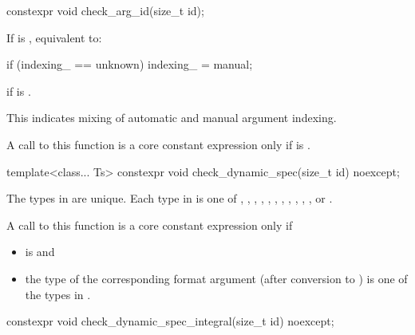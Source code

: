 %
\begin{itemdecl}
constexpr void check_arg_id(size_t id);
\end{itemdecl}

\begin{itemdescr}
\pnum
\effects
If  is , equivalent to:
\begin{codeblock}
if (indexing_ == unknown)
  indexing_ = manual;
\end{codeblock}

\pnum
\throws
{} if
 is .
\begin{note}
This indicates mixing of automatic and manual argument indexing.
\end{note}

\pnum
\remarks
A call to this function is a core constant expression only if
 is .
\end{itemdescr}

%
\begin{itemdecl}
template<class... Ts>
  constexpr void check_dynamic_spec(size_t id) noexcept;
\end{itemdecl}

\begin{itemdescr}
\pnum
\mandates
The types in  are unique.
Each type in  is one of
,
,
,
,
,
,
,
,
,
,
, or
.

\pnum
\remarks
A call to this function is a core constant expression only if
\begin{itemize}
\item
{} is  and
\item
the type of the corresponding format argument
(after conversion to ) is one of the types in .
\end{itemize}
\end{itemdescr}

%
\begin{itemdecl}
constexpr void check_dynamic_spec_integral(size_t id) noexcept;
\end{itemdecl}

